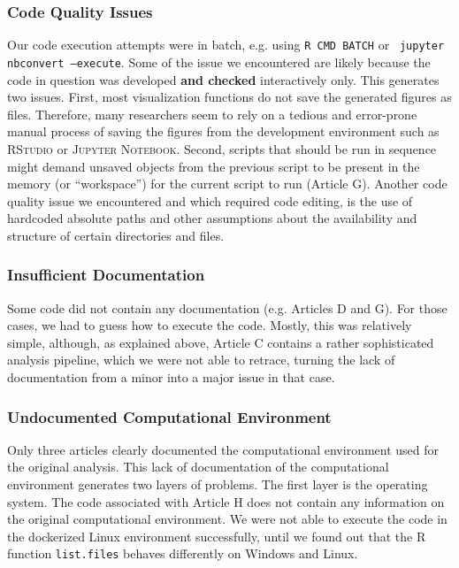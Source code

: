 \subsubsection{Code Quality Issues}

Our code execution attempts were in batch, e.g. using \texttt{R CMD BATCH} or \texttt{
jupyter nbconvert --execute}. Some of the issue we encountered are likely because the code in question was developed \textbf{and checked} interactively only. This generates two issues. First, most visualization functions do not save the generated figures as files. Therefore, many researchers seem to rely on a tedious and error-prone manual process of saving the figures from the development environment such as \textsc{RStudio} or \textsc{Jupyter Notebook}. Second, scripts that should be run in sequence might demand unsaved objects from the previous script to be present in the memory (or ``workspace'') for the current script to run (Article G).
Another code quality issue we encountered and which required code editing, is the use of hardcoded absolute paths and other assumptions about the availability and structure of certain directories and files.

\subsubsection{Insufficient Documentation}

Some code did not contain any documentation (e.g. Articles D and G). For those cases, we had to guess how to execute the code. Mostly, this was relatively simple, although, as explained above, Article C contains a rather sophisticated analysis pipeline, which we were not able to retrace, turning the lack of documentation from a minor into a major issue in that case.

\subsubsection{Undocumented Computational Environment}

Only three articles clearly documented the computational environment used for the original analysis. This lack of documentation of the computational environment generates two layers of problems. The first layer is the operating system. The code associated with Article {H} does not contain any information on the original computational environment. We were not able to execute the code in the dockerized Linux environment successfully, until we found out that the R function \texttt{list.files} behaves differently on Windows and Linux.

